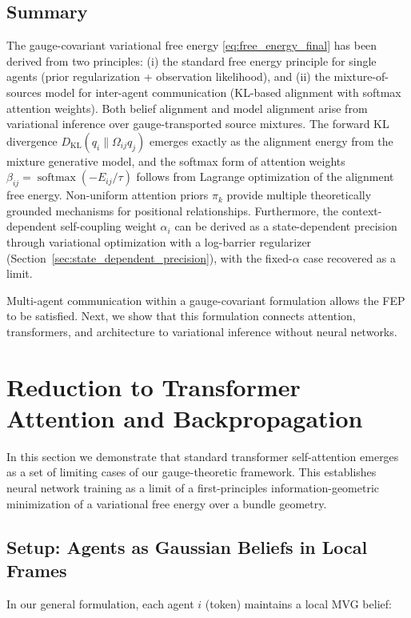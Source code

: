\documentclass[twoside,11pt]{article}
\begin{document}
\subsection{Summary}

The gauge-covariant variational free energy \eqref{eq:free_energy_final} has been derived from two principles: (i) the standard free energy principle for single agents (prior regularization + observation likelihood), and (ii) the mixture-of-sources model for inter-agent communication (KL-based alignment with softmax attention weights). Both belief alignment and model alignment arise from variational inference over gauge-transported source mixtures. The forward KL divergence $D_{\mathrm{KL}}(q_i \| \Omega_{ij}q_j)$ emerges exactly as the alignment energy from the mixture generative model, and the softmax form of attention weights $\beta_{ij} = \operatorname{softmax}(-E_{ij}/\tau)$ follows from Lagrange optimization of the alignment free energy. Non-uniform attention priors $\pi_k$ provide multiple theoretically grounded mechanisms for positional relationships. Furthermore, the context-dependent self-coupling weight $\alpha_i$ can be derived as a state-dependent precision through variational optimization with a log-barrier regularizer (Section~\ref{sec:state_dependent_precision}), with the fixed-$\alpha$ case recovered as a limit.

Multi-agent communication within a gauge-covariant formulation allows the FEP to be satisfied. Next, we show that this formulation connects attention, transformers, and architecture to variational inference without neural networks.

\section{Reduction to Transformer Attention and Backpropagation}

In this section we demonstrate that standard transformer self-attention emerges as a set of limiting cases of our gauge-theoretic framework. This establishes neural network training as a limit of a first-principles information-geometric minimization of a variational free energy over a bundle geometry.

\subsection{Setup: Agents as Gaussian Beliefs in Local Frames}

In our general formulation, each agent $i$ (token) maintains a local MVG belief:
\end{document}
